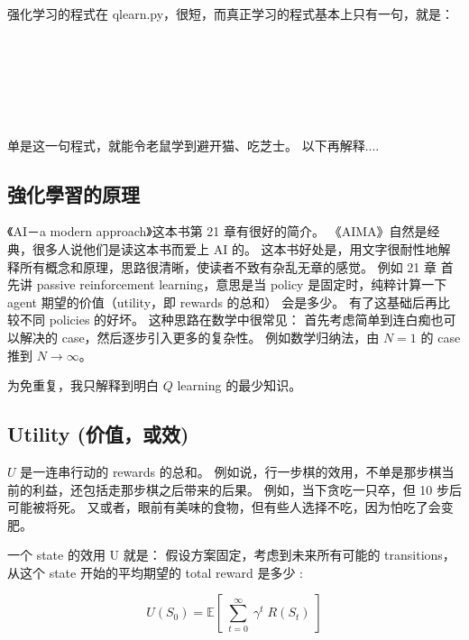 强化学习的程式在 qlearn.py，很短，而真正学习的程式基本上只有一句，就是：

\tab {}\\
\tab {}\\
\tab {} \\
\tab {}\\
\tab {}\\
\tab \code{\tab \textcolor{red}{self.q[(state, action)] = oldv + self.alpha * (value - oldv) }}

单是这一句程式，就能令老鼠学到避开猫、吃芝士。  以下再解释....


\subsection{強化學習的原理}

《AI－a modern approach》这本书第 21 章有很好的简介。  《AIMA》自然是经典，很多人说他们是读这本书而爱上 AI 的。  这本书好处是，用文字很耐性地解释所有概念和原理，思路很清晰，使读者不致有杂乱无章的感觉。  例如 21 章 首先讲 passive reinforcement learning，意思是当 policy 是固定时，纯粹计算一下 agent 期望的价值（utility，即 rewards 的总和） 会是多少。  有了这基础后再比较不同 policies 的好坏。  这种思路在数学中很常见： 首先考虑简单到连白痴也可以解决的 case，然后逐步引入更多的复杂性。  例如数学归纳法，由 $N=1$ 的 case 推到 $N \rightarrow \infty$。

为免重复，我只解释到明白 $Q$ learning 的最少知识。

\subsection{Utility (价值，或效)}

$U$ 是一连串行动的 rewards 的总和。  例如说，行一步棋的效用，不单是那步棋当前的利益，还包括走那步棋之后带来的后果。  例如，当下贪吃一只卒，但 10 步后可能被将死。  又或者，眼前有美味的食物，但有些人选择不吃，因为怕吃了会变肥。

一个 state 的效用 U 就是： 假设方案固定，考虑到未来所有可能的 transitions，从这个 state 开始的平均期望的 total reward 是多少 :

$$ U(S_0) = \mathbb{E}[ \; \sum_{t=0}^{\infty} \; \gamma^t \; R(S_t) \; ] $$

